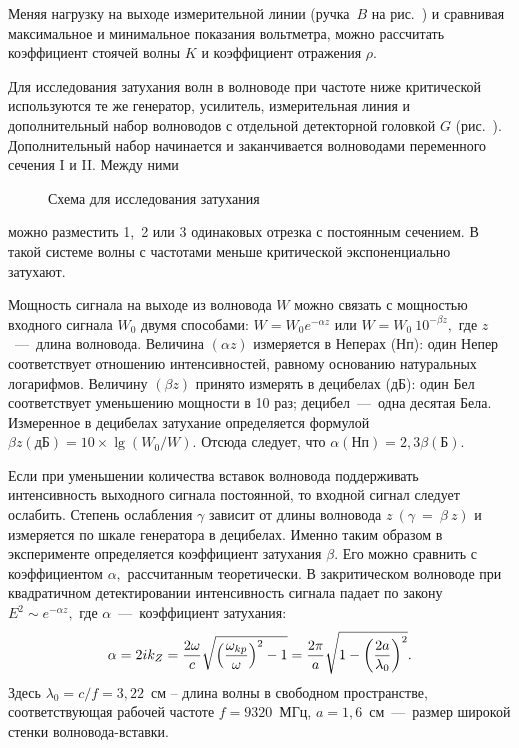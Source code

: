 Меняя нагрузку на выходе измерительной линии (ручка~$B$ на рис.~) и сравнивая максимальное и минимальное показания вольтметра, можно
рассчитать коэффициент стоячей волны $K$ и коэффициент отражения $\rho.$


Для исследования затухания волн в волноводе при частоте ниже критической
используются те же генератор, усилитель, измерительная линия и дополнительный
набор волноводов с отдельной детекторной головкой $G$ (рис.~). Дополнительный набор начинается и заканчивается волноводами
переменного сечения I и II. Между ними

\begin{figure}[h!]
    \caption{Схема для исследования затухания} 
\end{figure}

можно разместить 1,~2 или 3 одинаковых отрезка с постоянным сечением. В такой
системе волны с частотами меньше критической экспоненциально затухают.

Мощность сигнала на выходе из волновода $W$ можно связать с мощностью входного
сигнала $W_0$ двумя способами: $W=W_0e^{-\alpha z}$ или $W=W_0~10^{-\beta z},$
где $z$~---~длина волновода. Величина $(\alpha z)$ измеряется в Неперах (Нп):
один Непер соответствует отношению интенсивностей, равному основанию натуральных
логарифмов. Величину $(\beta z)$ принято измерять в децибелах (дБ): один Бел
соответствует уменьшению мощности в 10 раз; децибел~---~одна десятая Бела.
Измеренное в децибелах затухание определяется формулой $\beta
z(\text{дБ})=10\times\lg(W_0/W).$ Отсюда следует, что
$\alpha(\text{Нп})=2,3\beta(\text{Б}).$

Если при уменьшении количества вставок волновода поддерживать интенсивность
выходного сигнала постоянной, то входной сигнал следует ослабить. Степень
ослабления $\gamma$ зависит от длины волновода $z~(\gamma~=~\beta~z)$ и
измеряется по шкале генератора в децибелах. Именно таким образом в эксперименте
определяется коэффициент затухания $\beta.$ Его можно сравнить с коэффициентом
$\alpha,$ рассчитанным теоретически. В закритическом волноводе при квадратичном
детектировании интенсивность сигнала падает по закону $E^2\sim e^{-\alpha z},$
где $\alpha$~---~коэффициент затухания: 
\begin{equation} \eqmark{2.0.7}
\alpha=2ik_{Z}=\dfrac{2\omega}{c}\sqrt{\left(\dfrac{\omega_{kp}}{\omega}\right)^2-1}=
\dfrac{2\pi}{a}\sqrt{1-\left(\dfrac{2a}{\lambda_0}\right)^2}. 
\end{equation} 
Здесь $\lambda_0=c/f=3,22$~см – длина волны в свободном пространстве, 
соответствующая рабочей частоте $f=9320$~МГц, $a=1,6$~см~---~размер широкой 
стенки волновода-вставки.

